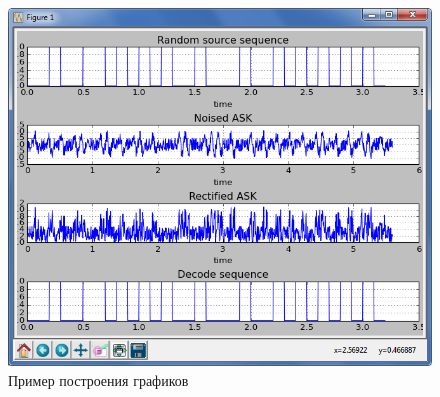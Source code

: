 \documentclass[utf8,usehyperref,12pt]{G7-32}
\begin{document}
\begin{figure}[H]
\begin{center}
\includegraphics[scale=0.8]{Image/3.png}
\caption{Пример построения графиков}
\end{center}
\end{figure}
\end{document}

